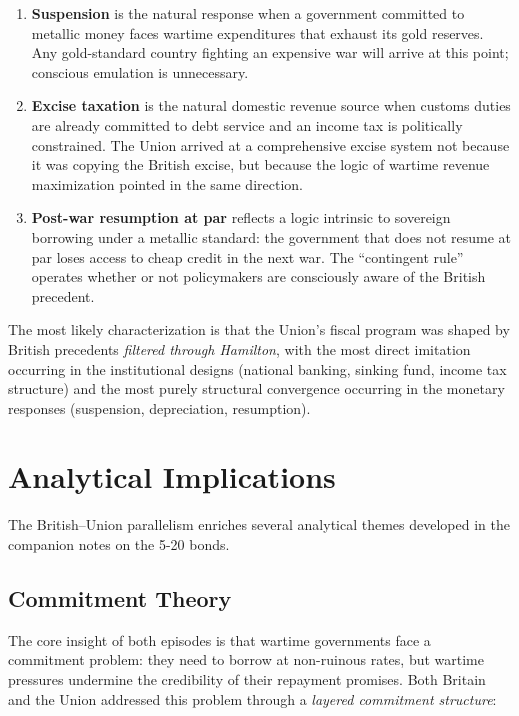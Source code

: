 \documentclass[12pt]{article}
\begin{document}
\begin{enumerate}
\item \textbf{Suspension} is the natural response when a government
  committed to metallic money faces wartime expenditures that exhaust
  its gold reserves. Any gold-standard country fighting an expensive war
  will arrive at this point; conscious emulation is unnecessary.

\item \textbf{Excise taxation} is the natural domestic revenue source
  when customs duties are already committed to debt service and an
  income tax is politically constrained. The Union arrived at a
  comprehensive excise system not because it was copying the British
  excise, but because the logic of wartime revenue maximization pointed
  in the same direction.

\item \textbf{Post-war resumption at par} reflects a logic intrinsic to
  sovereign borrowing under a metallic standard: the government that
  does not resume at par loses access to cheap credit in the next war.
  The ``contingent rule'' operates whether or not policymakers are
  consciously aware of the British precedent.
\end{enumerate}

The most likely characterization is that the Union's fiscal program was
shaped by British precedents \textit{filtered through Hamilton}, with
the most direct imitation occurring in the institutional designs
(national banking, sinking fund, income tax structure) and the most
purely structural convergence occurring in the monetary responses
(suspension, depreciation, resumption).

\section{Analytical Implications}

The British--Union parallelism enriches several analytical themes
developed in the companion notes on the 5-20 bonds.

\subsection{Commitment Theory}

The core insight of both episodes is that wartime governments face a
commitment problem: they need to borrow at non-ruinous rates, but
wartime pressures undermine the credibility of their repayment promises.
Both Britain and the Union addressed this problem through a
\textit{layered commitment structure}:
\end{document}
